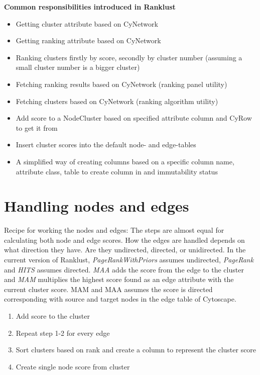 \textbf{Common responsibilities introduced in Ranklust}

\begin{itemize}
    \item Getting cluster attribute based on CyNetwork
    \item Getting ranking attribute based on CyNetwork
    \item Ranking clusters firstly by score, secondly by cluster number
        (assuming a small cluster number is a bigger cluster)
    \item Fetching ranking results based on CyNetwork (ranking panel utility)
    \item Fetching clusters based on CyNetwork (ranking algorithm utility)
    \item Add score to a NodeCluster based on specified attribute column and
        CyRow to get it from
    \item Insert cluster scores into the default node- and edge-tables
    \item A simplified way of creating columns based on a specific column name,
        attribute class, table to create column in and immutability status
\end{itemize}

\section{Handling nodes and edges}
Recipe for working the nodes and edges: The steps are almost equal for
calculating both node and edge scores. How the edges are handled depends on what
direction they have. Are they undirected, directed, or unidirected. In the
current version of Ranklust, \textit{PageRankWithPriors} assumes undirected,
\textit{PageRank} and \textit{HITS} assumes directed. \textit{MAA} adds the
score from the edge to the cluster and \textit{MAM} multiplies the highest score
found as an edge attribute with the current cluster score. MAM and MAA assumes
the score is directed corresponding with source and target nodes in the edge
table of Cytoscape.

\begin{enumerate}
    \item Add score to the cluster
    \item Repeat step 1-2 for every edge
    \item Sort clusters based on rank and create a column to represent the
        cluster score
    \item Create single node score from cluster
\end{enumerate}
